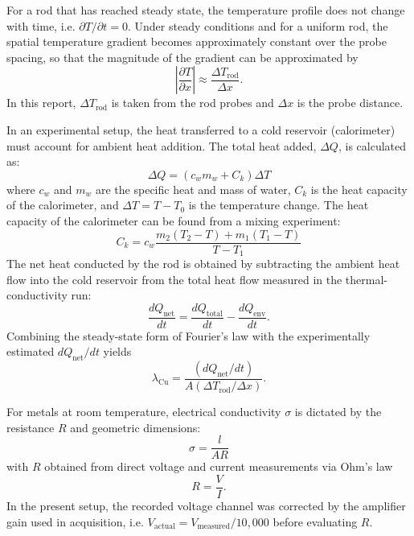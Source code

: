 \documentclass[journal]{IEEEtran}
\begin{document}
For a rod that has reached steady state, the temperature profile does not change with
time, i.e. $\partial T/\partial t = 0$. Under steady conditions and for a uniform rod,
the spatial temperature gradient becomes approximately constant over the probe spacing,
so that the magnitude of the gradient can be approximated by
\begin{equation}
    \left|\frac{\partial T}{\partial x}\right| \approx \frac{\Delta T_{\text{rod}}}{\Delta x}.
\end{equation}
In this report, $\Delta T_{\text{rod}}$ is taken from the rod probes and $\Delta x$ is the
probe distance.

In an experimental setup, the heat transferred to a cold reservoir (calorimeter) must account for ambient heat addition. The total heat added, $\Delta Q$, is calculated as:
\begin{equation}
    \Delta Q = (c_w m_w + C_k) \Delta T
\end{equation}
where $c_w$ and $m_w$ are the specific heat and mass of water, $C_k$ is the heat capacity of the calorimeter, and $\Delta T = T - T_0$ is the temperature change. The heat capacity of the calorimeter can be found from a mixing experiment:
\begin{equation}
    C_k = c_w \frac{m_2(T_2 - T) + m_1(T_1 - T)}{T - T_1}
\end{equation}
The net heat conducted by the rod is obtained by subtracting the ambient heat flow into the
cold reservoir from the total heat flow measured in the thermal-conductivity run:
\begin{equation}
    \frac{dQ_{\text{net}}}{dt} = \frac{dQ_{\text{total}}}{dt} - \frac{dQ_{\text{env}}}{dt}.
\end{equation}
Combining the steady-state form of Fourier's law with the experimentally estimated
$dQ_{\text{net}}/dt$ yields
\begin{equation}
    \lambda_{\text{Cu}} = \frac{\left(dQ_{\text{net}}/dt\right)}{A\left(\Delta T_{\text{rod}}/\Delta x\right)}.
\end{equation}

For metals at room temperature, electrical conductivity $\sigma$ is dictated by the resistance $R$ and geometric dimensions:
\begin{equation}
    \sigma = \frac{l}{A R}
\end{equation}
with $R$ obtained from direct voltage and current measurements via Ohm's law
\begin{equation}
    R = \frac{V}{I}.
\end{equation}
In the present setup, the recorded voltage channel was corrected by the amplifier gain
used in acquisition, i.e. $V_{\text{actual}} = V_{\text{measured}}/10{,}000$ before evaluating
$R$.
\end{document}
